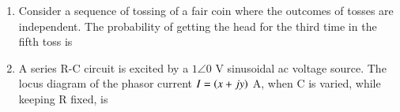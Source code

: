 \documentclass[journal,12pt,onecolumn]{IEEEtran}
\theoremstyle{remark}
\begin{document}
\begin{enumerate}
    \hfill{}
    
    \item Consider a sequence of tossing of a fair coin where the outcomes of tosses are independent. The probability of getting the head for the third time in the fifth toss is
    
    \hfill{}
    \begin{enumerate}
    \end{enumerate}
    
    \item A series R-C circuit is excited by a $1\angle0$ V sinusoidal ac voltage source. The locus diagram of the phasor current $I=\left(x+jy\right)$ A, when C is varied, while keeping R fixed, is
    

\end{enumerate}
\end{document}
